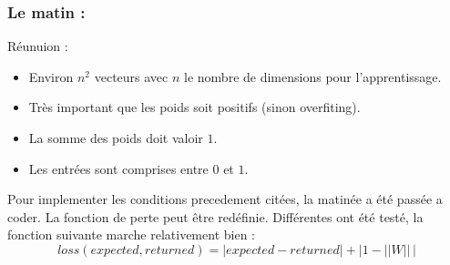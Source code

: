 \subsubsection*{Le matin :}
Réunuion :\\
\begin{itemize}
    \item Environ $n^2$ vecteurs avec $n$ le nombre de dimensions pour l'apprentissage.
    \item Très important que les poids soit positifs (sinon overfiting).
    \item La somme des poids doit valoir $1$.
    \item Les entrées sont comprises entre $0$ et $1$.
\end{itemize}
Pour implementer les conditions precedement citées, la matinée a été passée a coder.
La fonction de perte peut être redéfinie.
Différentes ont été testé, la fonction suivante marche relativement bien :
\begin{equation}
    \label{loss_abs}
    loss(expected, returned) = |expected - returned| + |1 - ||W||\,|
\end{equation}

